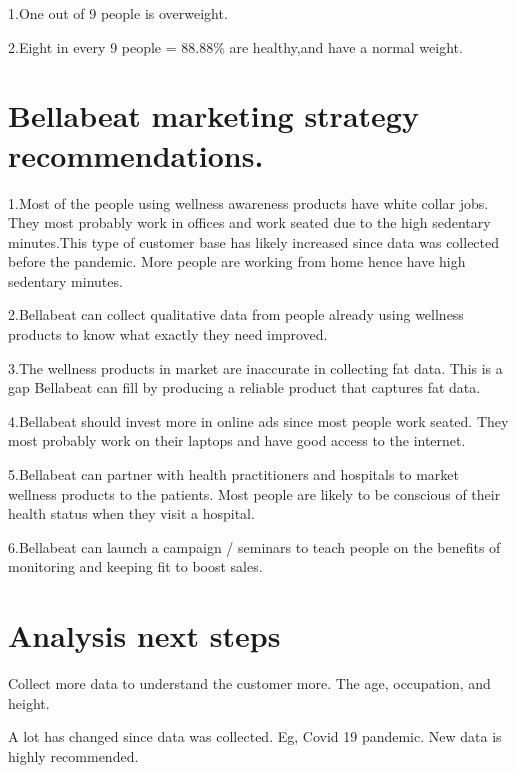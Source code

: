 \documentclass[
]{article}
\begin{document}
1.One out of 9 people is overweight.

2.Eight in every 9 people = 88.88\% are healthy,and have a normal
weight.

\hypertarget{bellabeat-marketing-strategy-recommendations.}{%
\section{Bellabeat marketing strategy
recommendations.}\label{bellabeat-marketing-strategy-recommendations.}}

1.Most of the people using wellness awareness products have white collar
jobs. They most probably work in offices and work seated due to the high
sedentary minutes.This type of customer base has likely increased since
data was collected before the pandemic. More people are working from
home hence have high sedentary minutes.

2.Bellabeat can collect qualitative data from people already using
wellness products to know what exactly they need improved.

3.The wellness products in market are inaccurate in collecting fat data.
This is a gap Bellabeat can fill by producing a reliable product that
captures fat data.

4.Bellabeat should invest more in online ads since most people work
seated. They most probably work on their laptops and have good access to
the internet.

5.Bellabeat can partner with health practitioners and hospitals to
market wellness products to the patients. Most people are likely to be
conscious of their health status when they visit a hospital.

6.Bellabeat can launch a campaign / seminars to teach people on the
benefits of monitoring and keeping fit to boost sales.

\hypertarget{analysis-next-steps}{%
\section{Analysis next steps}\label{analysis-next-steps}}

Collect more data to understand the customer more. The age, occupation,
and height.

A lot has changed since data was collected. Eg, Covid 19 pandemic. New
data is highly recommended.
\end{document}
